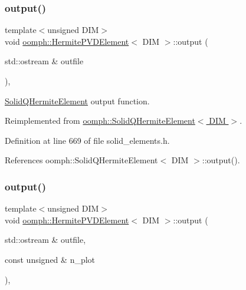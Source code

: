 \subsubsection{\texorpdfstring{output()}{output()}\hspace{0.1cm}{\footnotesize\ttfamily [1/4]}}
{\footnotesize\ttfamily template$<$unsigned D\+IM$>$ \\
void \hyperlink{classoomph_1_1HermitePVDElement}{oomph\+::\+Hermite\+P\+V\+D\+Element}$<$ D\+IM $>$\+::output (\begin{DoxyParamCaption}\item[{std\+::ostream \&}]{outfile }\end{DoxyParamCaption})\hspace{0.3cm}{\ttfamily [inline]}, {\ttfamily [virtual]}}



\hyperlink{classoomph_1_1SolidQHermiteElement}{Solid\+Q\+Hermite\+Element} output function. 



Reimplemented from \hyperlink{classoomph_1_1SolidQHermiteElement_a6459f239b585ae575d779f58f70bae46}{oomph\+::\+Solid\+Q\+Hermite\+Element$<$ D\+I\+M $>$}.



Definition at line 669 of file solid\+\_\+elements.\+h.



References oomph\+::\+Solid\+Q\+Hermite\+Element$<$ D\+I\+M $>$\+::output().

\mbox{\label{classoomph_1_1HermitePVDElement_a9de8d6a3b4e844189a97eb19e7b034c1}} 
\subsubsection{\texorpdfstring{output()}{output()}\hspace{0.1cm}{\footnotesize\ttfamily [2/4]}}
{\footnotesize\ttfamily template$<$unsigned D\+IM$>$ \\
void \hyperlink{classoomph_1_1HermitePVDElement}{oomph\+::\+Hermite\+P\+V\+D\+Element}$<$ D\+IM $>$\+::output (\begin{DoxyParamCaption}\item[{std\+::ostream \&}]{outfile,  }\item[{const unsigned \&}]{n\+\_\+plot }\end{DoxyParamCaption})\hspace{0.3cm}{\ttfamily [inline]}, {\ttfamily [virtual]}}




